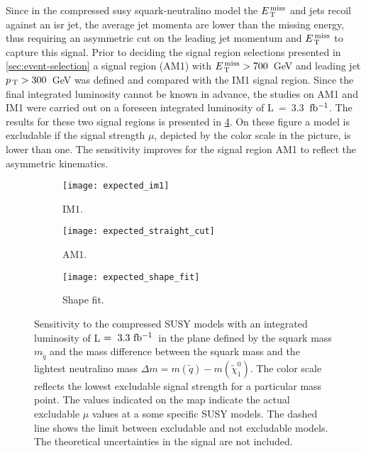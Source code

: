 Since in the compressed \gls{susy} squark-neutralino model the $E_\mathrm{\, T}^\mathrm{\, miss}$ and jets
recoil against an \gls{isr} jet, the average jet momenta are lower than the
missing energy, thus requiring an asymmetric cut on the leading jet momentum and
$E_\mathrm{\, T}^\mathrm{\, miss}$ to capture this signal. Prior to deciding the signal region selections
presented in \cref{sec:event-selection} a signal region (AM1) with
$E_\mathrm{\, T}^\mathrm{\, miss} > 700$~GeV and leading jet $p_\mathrm{\, T} > 300$~GeV was defined and compared with
the IM1 signal region. Since the final integrated luminosity cannot be known in
advance, the studies on AM1 and IM1 were carried out on a foreseen integrated
luminosity of L~=~3.3~$\mbox{fb$^{-1}$}$. The results for these two signal regions is
presented in \cref{fig:im1_straight_comparison}. On these figure a model is
excludable if the signal strength $\mu$, depicted by the color scale in the
picture, is lower than one. The sensitivity improves for the signal region AM1
to reflect the asymmetric kinematics.
\begin{figure}[!htb]
  \centering
  \begin{subfigure}[t]{.48\linewidth}
    \texttt{[image: expected\_im1]}
    \caption{IM1.}
    \label{fig:expected_im1}
  \end{subfigure}
  \begin{subfigure}[t]{.48\linewidth}
    \texttt{[image: expected\_straight\_cut]}
    \caption{AM1.}
    \label{fig:expected_straight}
  \end{subfigure}

  \begin{subfigure}[t]{.48\linewidth}
    \texttt{[image: expected\_shape\_fit]}
    \caption{Shape fit.}
    \label{fig:expected_shape}
  \end{subfigure}
  \caption{Sensitivity to the compressed SUSY models with an integrated
    luminosity of L$~=~3.3~\mbox{fb$^{-1}$}$~in the plane defined by the squark mass
    $m_{\tilde{q}}$ and the mass difference between the squark mass and the
    lightest neutralino mass
    $\Delta m = m(\tilde{q}) - m(\tilde{\chi}_{1}^{0})$. The color scale
    reflects the lowest excludable signal strength for a particular mass
    point. The values indicated on the map indicate the actual excludable $\mu$
    values at a some specific SUSY models. The dashed line shows the limit
    between excludable and not excludable models. The theoretical uncertainties
    in the signal are not included.}
  \label{fig:im1_straight_comparison}
\end{figure}

